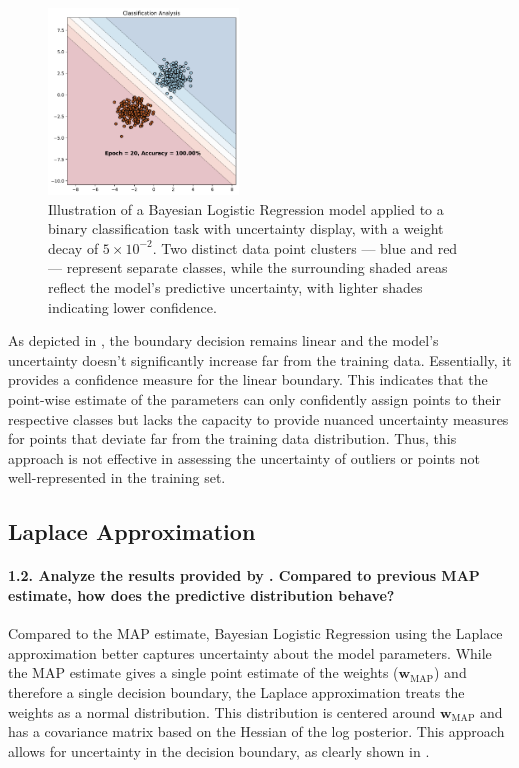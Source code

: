 \begin{figure}[H]
    \centering
    \includegraphics[width=0.45\textwidth]{logreg_map.pdf}
    \caption{Illustration of a Bayesian Logistic Regression model applied to a binary classification task with uncertainty display, with a weight decay of $5 \times 10^{-2}$. Two distinct data point clusters — blue and red — represent separate classes, while the surrounding shaded areas reflect the model's predictive uncertainty, with lighter shades indicating lower confidence.}
    \label{fig:logreg_map}
\end{figure}

As depicted in , the boundary decision remains linear and the model's uncertainty doesn't significantly increase far from the training data. Essentially, it provides a confidence measure for the linear boundary. This indicates that the point-wise estimate of the parameters can only confidently assign points to their respective classes but lacks the capacity to provide nuanced uncertainty measures for points that deviate far from the training data distribution. Thus, this approach is not effective in assessing the uncertainty of outliers or points not well-represented in the training set.

\subsection{Laplace Approximation}
\paragraph{1.2. Analyze the results provided by . Compared to previous MAP estimate, how does the predictive distribution behave?}

Compared to the MAP estimate, Bayesian Logistic Regression using the Laplace approximation better captures uncertainty about the model parameters. While the MAP estimate gives a single point estimate of the weights ($\mathbf{w}_{\textrm{MAP}}$) and therefore a single decision boundary, the Laplace approximation treats the weights as a normal distribution. This distribution is centered around $\mathbf{w}_{\textrm{MAP}}$ and has a covariance matrix based on the Hessian of the log posterior. This approach allows for uncertainty in the decision boundary, as clearly shown in .

